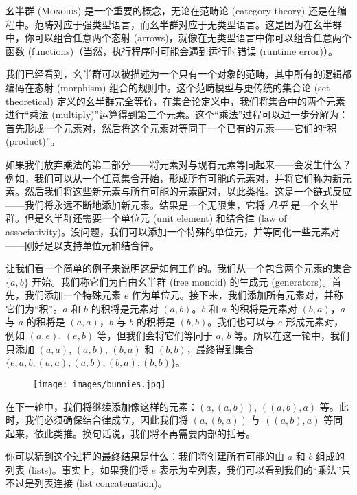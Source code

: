 
\lettrine[lhang=0.17]{幺}{半群 (Monoids) 是一个重要}的概念，无论在范畴论 (category theory) 还是在编程中。范畴对应于强类型语言，而幺半群对应于无类型语言。这是因为在幺半群中，你可以组合任意两个态射 (arrows)，就像在无类型语言中你可以组合任意两个函数 (functions)（当然，执行程序时可能会遇到运行时错误 (runtime error)）。

我们已经看到，幺半群可以被描述为一个只有一个对象的范畴，其中所有的逻辑都编码在态射 (morphism) 组合的规则中。这个范畴模型与更传统的集合论 (set-theoretical) 定义的幺半群完全等价，在集合论定义中，我们将集合中的两个元素进行“乘法 (multiply)”运算得到第三个元素。这个“乘法”过程可以进一步分解为：首先形成一个元素对，然后将这个元素对等同于一个已有的元素——它们的“积 (product)”。

如果我们放弃乘法的第二部分——将元素对与现有元素等同起来——会发生什么？例如，我们可以从一个任意集合开始，形成所有可能的元素对，并将它们称为新元素。然后我们将这些新元素与所有可能的元素配对，以此类推。这是一个链式反应——我们将永远不断地添加新元素。结果是一个无限集，它将 \emph{几乎} 是一个幺半群。但是幺半群还需要一个单位元 (unit element) 和结合律 (law of associativity)。没问题，我们可以添加一个特殊的单位元，并等同化一些元素对——刚好足以支持单位元和结合律。

让我们看一个简单的例子来说明这是如何工作的。我们从一个包含两个元素的集合 $\{a, b\}$ 开始。我们称它们为自由幺半群 (free monoid) 的生成元 (generators)。首先，我们添加一个特殊元素 $e$ 作为单位元。接下来，我们添加所有元素对，并称它们为“积”。$a$ 和 $b$ 的积将是元素对 $(a, b)$。$b$ 和 $a$ 的积将是元素对 $(b, a)$，$a$ 与 $a$ 的积将是 $(a, a)$，$b$ 与 $b$ 的积将是 $(b, b)$。我们也可以与 $e$ 形成元素对，例如 $(a, e)$, $(e, b)$ 等，但我们会将它们等同于 $a$, $b$ 等。所以在这一轮中，我们只添加 $(a, a)$, $(a, b)$, $(b, a)$ 和 $(b, b)$，最终得到集合 $\{e, a, b, (a, a), (a, b), (b, a), (b, b)\}$。

\begin{figure}[H]
  \centering
  \texttt{[image: images/bunnies.jpg]}
\end{figure}

\noindent
在下一轮中，我们将继续添加像这样的元素：$(a, (a, b))$, $((a, b), a)$ 等。此时，我们必须确保结合律成立，因此我们将 $(a, (b, a))$ 与 $((a, b), a)$ 等同起来，依此类推。换句话说，我们将不再需要内部的括号。

你可以猜到这个过程的最终结果是什么：我们将创建所有可能的由 $a$ 和 $b$ 组成的列表 (lists)。事实上，如果我们将 $e$ 表示为空列表，我们可以看到我们的“乘法”只不过是列表连接 (list concatenation)。


